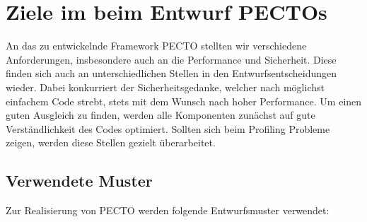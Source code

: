 \section{Ziele im beim Entwurf PECTOs}
An das zu entwickelnde Framework PECTO stellten wir verschiedene Anforderungen, insbesondere auch an die Performance und Sicherheit. 
Diese finden sich auch an unterschiedlichen Stellen in den Entwurfsentscheidungen wieder.  
Dabei konkurriert der Sicherheitsgedanke, welcher nach möglichst einfachem Code strebt, stets mit dem Wunsch nach hoher Performance.
Um einen guten Ausgleich zu finden, werden alle Komponenten zunächst auf gute Verständlichkeit des Codes optimiert.
Sollten sich beim Profiling Probleme zeigen, werden diese Stellen gezielt überarbeitet.

\subsection*{Verwendete Muster}
Zur Realisierung von PECTO werden folgende Entwurfsmuster verwendet:

